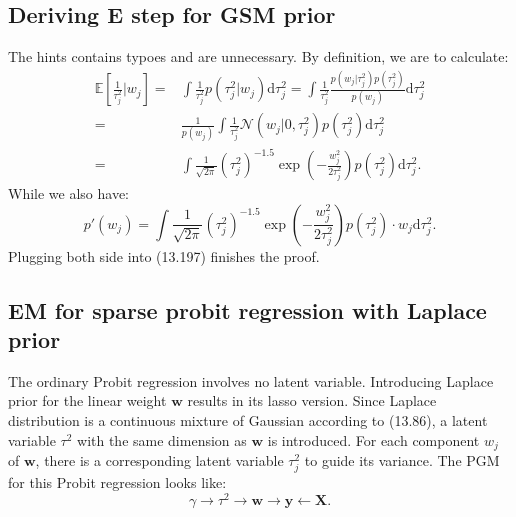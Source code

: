 \documentclass[UTF8]{ctexart}
\begin{document}
\subsection{Deriving E step for GSM prior}
The hints contains typoes and are unnecessary.
By definition, we are to calculate:
\begin{align}
\mathbb{E}\left[\frac{1}{\tau_{j}^{2}}|w_{j}\right]=&\int \frac{1}{\tau_{j}^{2}}p(\tau_{j}^{2}|w_{j})\text{d}\tau_{j}^{2}=\int \frac{1}{\tau_{j}^{2}}\frac{p(w_{j}|\tau_{j}^{2})p(\tau_{j}^{2})}{p(w_{j})}\text{d}\tau_{j}^{2}\nonumber \\
=&\frac{1}{p(w_{j})}\int \frac{1}{\tau_{j}^{2}}\mathcal{N}(w_{j}|0,\tau_{j}^{2})p(\tau_{j}^{2})\text{d}\tau_{j}^{2}\nonumber\\
=&\int\frac{1}{\sqrt{2\pi}}(\tau_{j}^{2})^{-1.5}\exp(-\frac{w_{j}^{2}}{2\tau_{j}^{2}})p(\tau^{2}_{j})\text{d}\tau_{j}^{2}.\nonumber
\end{align}
While we also have:
$$p'(w_{j})=\int\frac{1}{\sqrt{2\pi}}(\tau_{j}^{2})^{-1.5}\exp(-\frac{w_{j}^{2}}{2\tau_{j}^{2}})p(\tau^{2}_{j})\cdot w_{j}\text{d}\tau_{j}^{2}.$$
Plugging both side into (13.197) finishes the proof.

\subsection{EM for sparse probit regression with Laplace prior}
The ordinary Probit regression involves no latent variable. 
Introducing Laplace prior for the linear weight $\textbf{w}$ results in its lasso version. 
Since Laplace distribution is a continuous mixture of Gaussian according to (13.86), a latent variable $\tau^{2}$ with the same dimension as $\textbf{w}$ is introduced. 
For each component $w_{j}$ of $\textbf{w}$, there is a corresponding latent variable $\tau^{2}_{j}$ to guide its variance.
The PGM for this Probit regression looks like:
$$\gamma \rightarrow \tau^{2} \rightarrow \textbf{w} \rightarrow \textbf{y} \leftarrow \textbf{X}.$$
\end{document}
